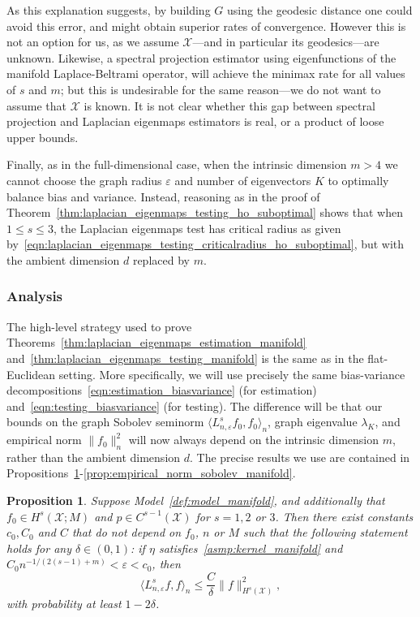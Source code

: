 \documentclass[aos]{imsart}
\theoremstyle{plain}
\newtheorem{proposition}{Proposition}
\theoremstyle{definition}
\theoremstyle{remark}
\newcommand{\dotp}[2]{\langle #1, #2 \rangle}
\newcommand{\mc}[1]{\mathcal{#1}}
\newcommand{\1}{\mathbf{1}}
\begin{document}
As this explanation suggests, by building $G$ using the geodesic distance one could avoid this error, and might obtain superior rates of convergence. However this is not an option for us, as we assume $\mc{X}$---and in particular its geodesics---are unknown. Likewise, a spectral projection estimator using eigenfunctions of the manifold Laplace-Beltrami operator, will achieve the minimax rate for all values of $s$ and $m$; but this is undesirable for the same reason---we do not want to assume that $\mc{X}$ is known. It is not clear whether this gap between spectral projection and Laplacian eigenmaps estimators is real, or a product of loose upper bounds. 

Finally, as in the full-dimensional case, when the intrinsic dimension $m > 4$ we cannot choose the graph radius $\varepsilon$ and number of eigenvectors $K$ to optimally balance bias and variance.  Instead, reasoning as in the proof of Theorem~\ref{thm:laplacian_eigenmaps_testing_ho_suboptimal} shows that when $1 \leq s \leq 3$, the Laplacian eigenmaps test has critical radius as given by~\eqref{eqn:laplacian_eigenmaps_testing_criticalradius_ho_suboptimal}, but with the ambient dimension $d$ replaced by $m$.

\subsubsection{Analysis}
The high-level strategy used to prove Theorems~\ref{thm:laplacian_eigenmaps_estimation_manifold} and~\ref{thm:laplacian_eigenmaps_testing_manifold} is the same as in the flat-Euclidean setting. More specifically, we will use precisely the same bias-variance decompositions~\eqref{eqn:estimation_biasvariance} (for estimation) and~\eqref{eqn:testing_biasvariance} (for testing). The difference will be that our bounds on the graph Sobolev seminorm $\dotp{L_{n,\varepsilon}^sf_0}{f_0}_n$, graph eigenvalue $\lambda_K$, and empirical norm $\|f_0\|_n^2$ will now always depend on the intrinsic dimension $m$, rather than the ambient dimension $d$. The precise results we use are contained in Propositions~\ref{prop:graph_seminorm_manifold}-\ref{prop:empirical_norm_sobolev_manifold}.
\begin{proposition}
	\label{prop:graph_seminorm_manifold} 
	Suppose Model~\ref{def:model_manifold}, and additionally that $f_0 \in H^s(\mc{X};M)$ and $p \in C^{s - 1}(\mc{X})$ for $s = 1,2$ or $3$. Then there exist constants $c_0,C_0$ and $C$ that do not depend on $f_0$, $n$ or $M$ such that the following statement holds for any $\delta \in (0,1)$: if $\eta$ satisfies~\ref{asmp:kernel_manifold} and $C_0n^{-1/(2(s - 1) + m)} < \varepsilon < c_0$, then
	\begin{equation}
	\label{eqn:graph_seminorm_manifold}
	\dotp{L_{n,\varepsilon}^s f}{f}_n \leq \frac{C}{\delta} \|f\|_{H^s(\mc{X})}^2,
	\end{equation}
	with probability at least $1 - 2\delta$.
\end{proposition}
\end{document}
